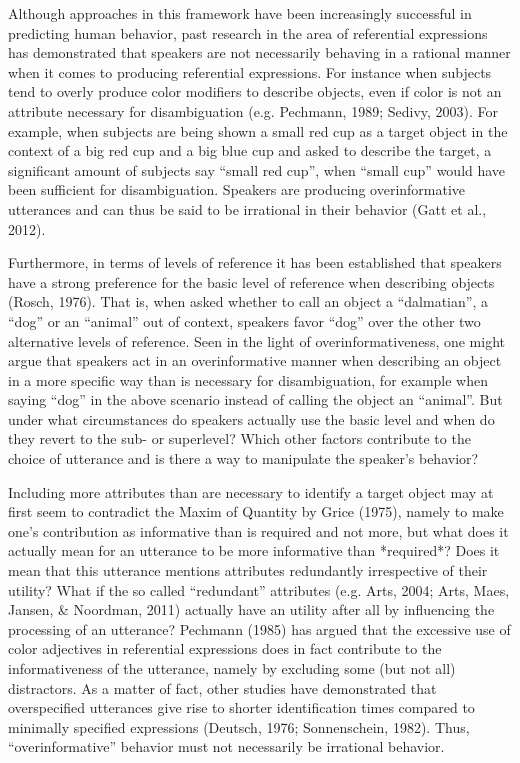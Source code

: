 \documentclass[10pt,letterpaper]{article}
\begin{document}
Although approaches in this framework have been increasingly successful in predicting human behavior, past research in the area of referential expressions has demonstrated that speakers are not necessarily behaving in a rational manner when it comes to producing referential expressions. For instance when subjects tend to overly produce color modifiers to describe objects, even if color is not an attribute necessary for disambiguation (e.g. Pechmann, 1989; Sedivy, 2003). For example, when subjects are being shown a small red cup as a target object in the context of a big red cup and a big blue cup and asked to describe the target, a significant amount of subjects say ``small red cup'', when ``small cup'' would have been sufficient for disambiguation. Speakers are producing overinformative utterances and can thus be said to be irrational in their behavior (Gatt et al., 2012). 

Furthermore, in terms of levels of reference it has been established that speakers have a strong preference for the basic level of reference when describing objects (Rosch, 1976). That is, when asked whether to call an object a ``dalmatian'', a ``dog'' or an ``animal'' out of context, speakers favor ``dog'' over the other two alternative levels of reference. Seen in the light of overinformativeness, one might argue that speakers act in an overinformative manner when describing an object in a more specific way than is necessary for disambiguation, for example when saying ``dog'' in the above scenario instead of calling the object an ``animal''. But under what circumstances do speakers actually use the basic level and when do they revert to the sub- or superlevel? Which other factors contribute to the choice of utterance and is there a way to manipulate the speaker's behavior? 

Including more attributes than are necessary to identify a target object may at first seem to contradict the Maxim of Quantity by Grice (1975), namely to make one's contribution as informative than is required and not more, but what does it actually mean for an utterance to be more informative than *required*? Does it mean that this utterance mentions attributes redundantly irrespective of their utility? What if the so called ``redundant'' attributes (e.g. Arts, 2004; Arts, Maes, Jansen, \& Noordman, 2011) actually have an utility after all by influencing the processing of an utterance? Pechmann (1985) has argued that the excessive use of color adjectives in referential expressions does in fact contribute to the informativeness of the utterance, namely by excluding some (but not all) distractors. As a matter of fact, other studies have demonstrated that overspecified utterances give rise to shorter identification times compared to minimally specified expressions (Deutsch, 1976; Sonnenschein, 1982). Thus, ``overinformative'' behavior must not necessarily be irrational behavior. 
\end{document}
